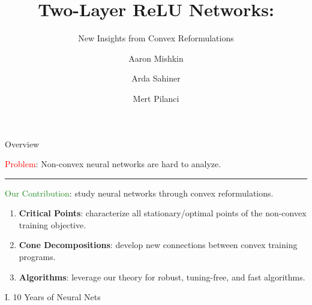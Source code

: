 \documentclass[usenames,dvipsnames,mathserif,notheorems]{beamer}
\title{Two-Layer ReLU Networks:}
\subtitle{New Insights from Convex Reformulations}
\author{Aaron Mishkin \and Arda Sahiner \and Mert Pilanci}
\date{}
\newcommand{\horizontalrule}{
	{
			\vspace{-0.5em}
			\center \rule{\textwidth}{0.1em}
			\vspace{-0.2em}
		}
}
\newcommand{\red}[1]{\textcolor{Red}{#1}}
\newcommand{\green}[1]{\textcolor{ForestGreen}{#1}}
\begin{document}
\maketitle

\begin{frame}{Overview}

	{
		\large \red{Problem}: Non-convex neural networks are hard to analyze.
	}

	\pause
	\vspace{0.5em}
	\horizontalrule
	\vspace{0.5em}

	{
		\large \green{Our Contribution}: study neural networks through convex reformulations.
	}

	\pause
	\vspace{0.5em}

	\begin{enumerate}
		\item \textbf{Critical Points}: characterize all stationary/optimal points of the non-convex training objective.\pause

		\item \textbf{Cone Decompositions}: develop new connections between convex training programs.\pause

		\item \textbf{Algorithms}: leverage our theory for robust, tuning-free, and fast algorithms.
	\end{enumerate}

\end{frame}


\begin{frame}{}
	\begin{center}
		\huge I. 10 Years of Neural Nets
	\end{center}
\end{frame}
\end{document}
